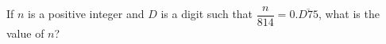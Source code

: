 If $n$ is a positive integer and $D$ is a digit such that $\dfrac{n}{814}=0.\overline{D75}$, what is the value of $n$?
